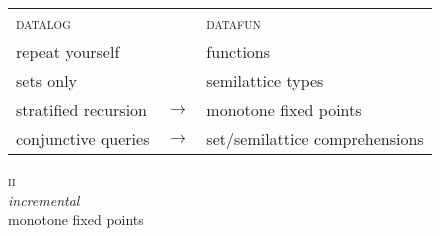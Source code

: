 \documentclass[aspectratio=141,dvipsnames]{beamer}
\newcommand\standout{\color{standout}}
\providecommand\displayfamily\rmfamily
\newcommand\naive{na\"ive}
\newcommand\interlude{\Huge\standout\displayfamily}
\begin{document}

  \begin{frame}

    \begin{center}
      \begin{tabular}{@{}lcl@{}}
        \scshape\color{Blue} datalog && \scshape\color{Blue} datafun
        \\[.5ex]
        \color{gray} repeat yourself &&
        \color{gray} functions
        \\
        \color{gray} sets only &&
        \color{gray} semilattice types
        \\
        stratified recursion
        & $\to$
        & monotone fixed points
        \\
        conjunctive queries
        & $\to$
        & set/semilattice comprehensions
      \end{tabular}
    \end{center}





  \end{frame}


  \begin{frame}
    \interlude
    \begin{center}
      {\upshape\scshape ii}
      \\
      \emph{incremental}
      \\
      monotone fixed points
    \end{center}
  \end{frame}
\end{document}
